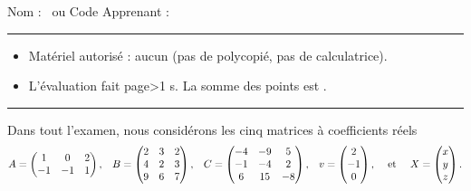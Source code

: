 

\SetDate[27/10/2026]
\reversemarginpar
\setlength{\marginparsep}{.5cm}




\null\vspace{-20pt}
Nom : \hrulefill ~ou Code Apprenant :  \rule{3cm}{.1pt}

\begin{itemize}[label=$\bullet$]
	\item
	Matériel autorisé : aucun (pas de polycopié, pas de calculatrice).
	\item
	L'évaluation fait \pageref{lastpage} page\ifnum{}>1 s\fi. La somme des points est .
\end{itemize}

\hrule 

\marginpar{[pts]}

\vspace{10pt}

Dans tout l'examen, nous considérons les cinq matrices à coefficients réels
\begin{align*}
	A = \begin{pmatrix} 1 & 0 & 2 \\ -1 & -1 & 1 \end{pmatrix}, && B = \begin{pmatrix} 2&3&2\\4&2&3\\9&6&7 \end{pmatrix}, && C = \begin{pmatrix} -4&-9&5\\-1&-4&2\\6&15&-8 \end{pmatrix}, && v = \begin{pmatrix}2\\-1\\0\end{pmatrix}, && \text{ et } && X =\begin{pmatrix}x\\y\\z\end{pmatrix}.
\end{align*}

